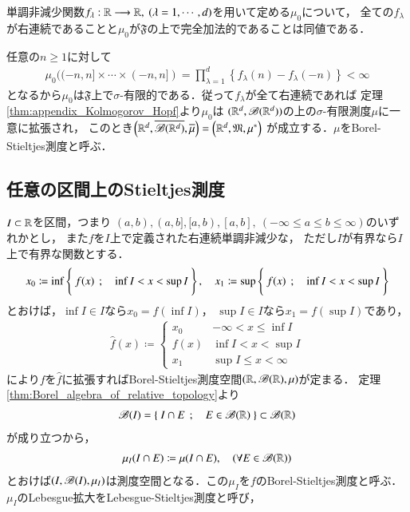	\begin{screen}
		\begin{thm}[右連続性と完全加法性]
			単調非減少関数$f_\lambda:\R \longrightarrow \R,\ (\lambda=1,\cdots,d)$を用いて定める$\mu_0$について，
			全ての$f_\lambda$が右連続であることと$\mu_0$が$\mathfrak{F}$の上で完全加法的であることは同値である．
		\end{thm}
	\end{screen}
	
	任意の$n \geq 1$に対して
	\begin{align}
		\mu_0((-n,n] \times \cdots \times (-n,n]) 
		= \prod_{\lambda=1}^d \left\{f_\lambda(n) - f_\lambda(-n)\right\} < \infty
	\end{align}
	となるから$\mu_0$は$\mathfrak{F}$上で$\sigma$-有限的である．従って$f_\lambda$が全て右連続であれば
	定理\ref{thm:appendix_Kolmogorov_Hopf}より$\mu_0$は
	$(\mathbb{R}^d,\mathscr{B}(\mathbb{R}^d))$の上の$\sigma$-有限測度$\mu$に一意に拡張され，
	このとき$\left(\mathbb{R}^d,\overline{\mathscr{B}(\mathbb{R}^d)},\overline{\mu}\right) = \left(\mathbb{R}^d,\mathfrak{M},\mu^*\right)$
	が成立する．$\mu$をBorel-Stieltjes測度と呼ぶ．
	
\subsection{任意の区間上のStieltjes測度}
	$I \subset \mathbb{R}$を区間，つまり
	$(a,b),(a,b],[a,b),[a,b],\ (-\infty \leq a \leq b \leq \infty)$のいずれかとし，
	また$f$を$I$上で定義された右連続単調非減少な，
	ただし$I$が有界なら$I$上で有界な関数とする．
	\begin{align}
		x_0 \coloneqq \operatorname*{inf}_{} \left\{\ f(x)\ \, ; \quad \operatorname*{inf}_{} I < x < \operatorname*{sup}_{} I\ \right\},
		\quad x_1 \coloneqq \operatorname*{sup}_{} \left\{\ f(x)\ \, ; \quad \operatorname*{inf}_{} I < x < \operatorname*{sup}_{} I\ \right\}
	\end{align}
	とおけば，$\inf{}{I} \in I$なら$x_0 = f(\inf{}{I})$，
	$\sup{}{I} \in I$なら$x_1 = f(\sup{}{I})$であり，
	\begin{align}
		\hat{f}(x) \coloneqq 
		\begin{cases}
			x_0 & -\infty < x \leq \inf{}{I} \\
			f(x) & \inf{}{I} < x < \sup{}{I} \\
			x_1 & \sup{}{I} \leq x < \infty
		\end{cases}
	\end{align}
	により$f$を$\hat{f}$に拡張すればBorel-Stieltjes測度空間$(\mathbb{R},\mathscr{B}(\mathbb{R}),\mu)$が定まる．
	定理\ref{thm:Borel_algebra_of_relative_topology}より
	\begin{align}
		\mathscr{B}(I) = \left\{\ I \cap E\ \, ; \quad E \in \mathscr{B}(\mathbb{R})\ \right\} \subset \mathscr{B}(\mathbb{R})
	\end{align}
	が成り立つから，
	\begin{align}
		\mu_I(I \cap E) \coloneqq \mu(I \cap E),
		\quad (\forall E \in \mathscr{B}(\mathbb{R}))
	\end{align}
	とおけば$(I,\mathscr{B}(I),\mu_I)$は測度空間となる．この$\mu_I$を$f$のBorel-Stieltjes測度と呼ぶ．
	$\mu_I$のLebesgue拡大をLebesgue-Stieltjes測度と呼び，
	
